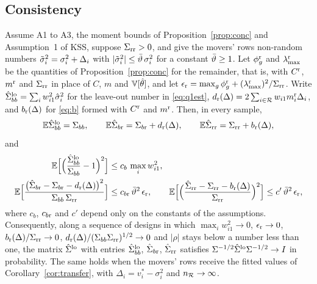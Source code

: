 \subsection{Consistency}

\begin{proposition}[The covariance matrix for $q=1$]\label{prop:q1}
Assume A1 to A3, the moment bounds of Proposition~\ref{prop:conc} and Assumption~1 of KSS, suppose
$\Sigma_{\rm rr}>0$, and give the movers' rows non-random numbers $\tilde\sigma_i^2=\sigma_i^2+\Delta_i$ with
$|\tilde\sigma_i^2|\le\bar\vartheta\,\sigma_i^2$ for a constant $\bar\vartheta\ge1$. Let
$\phi_g^{\rm r}$ and $\lambda_{\max}^{\rm r}$ be the quantities of Proposition~\ref{prop:conc} for the remainder,
that is, with $C^{\rm r}$, $m^{\rm r}$ and $\Sigma_{\rm rr}$ in place of $C$, $m$ and $\mathbb{V}[\hat\theta]$, and let
$\epsilon_{\rm r}=\max_g\phi_g^{\rm r}+(\lambda_{\max}^{\rm r})^2/\Sigma_{\rm rr}$. Write
$\hat\Sigma_{bb}^{\rm lo}=\sum_iw_{i1}^2\hat\sigma_i^2$ for the leave-out number in \eqref{eq:q1est},
$d_{\rm r}(\Delta)=2\sum_{i\in\mathcal{R}}w_{i1}m_i^{\rm r}\Delta_i$, and $b_{\rm r}(\Delta)$ for \eqref{eq:b} formed with
$C^{\rm r}$ and $m^{\rm r}$. Then, in every sample,
\[
\mathbb{E}\hat\Sigma_{bb}^{\rm lo}=\Sigma_{bb},\qquad \mathbb{E}\hat\Sigma_{b{\rm r}}=\Sigma_{b{\rm r}}+d_{\rm r}(\Delta),\qquad
\mathbb{E}\hat\Sigma_{\rm rr}=\Sigma_{\rm rr}+b_{\rm r}(\Delta),
\]
and
\begin{align*}
\mathbb{E}\Big[\Big(\frac{\hat\Sigma_{bb}^{\rm lo}}{\Sigma_{bb}}-1\Big)^2\Big]&\le c_b\,\max_iw_{i1}^2,\\
\mathbb{E}\Big[\frac{\big(\hat\Sigma_{b{\rm r}}-\Sigma_{b{\rm r}}-d_{\rm r}(\Delta)\big)^2}{\Sigma_{bb}\,\Sigma_{\rm rr}}\Big]&\le c_{b{\rm r}}\,\bar\vartheta^2\,\epsilon_{\rm r},\qquad
\mathbb{E}\Big[\Big(\frac{\hat\Sigma_{\rm rr}-\Sigma_{\rm rr}-b_{\rm r}(\Delta)}{\Sigma_{\rm rr}}\Big)^2\Big]\le c'\,\bar\vartheta^2\,\epsilon_{\rm r},
\end{align*}
where $c_b$, $c_{b{\rm r}}$ and $c'$ depend only on the constants of the assumptions. Consequently, along a
sequence of designs in which $\max_iw_{i1}^2\to0$, $\epsilon_{\rm r}\to0$, $b_{\rm r}(\Delta)/\Sigma_{\rm rr}\to0$,
$d_{\rm r}(\Delta)/(\Sigma_{bb}\Sigma_{\rm rr})^{1/2}\to0$ and $|\rho|$ stays below a number less than one, the matrix
$\hat\Sigma^{\rm lo}$ with entries $\hat\Sigma_{bb}^{\rm lo}$, $\hat\Sigma_{b{\rm r}}$, $\hat\Sigma_{\rm rr}$ satisfies
$\Sigma^{-1/2}\hat\Sigma^{\rm lo}\Sigma^{-1/2}\to I$ in probability. The same holds when the movers' rows receive
the fitted values of Corollary~\ref{cor:transfer}, with $\Delta_i=v_i^*-\sigma_i^2$ and $n_{\mathcal{R}}\to\infty$.
\end{proposition}

